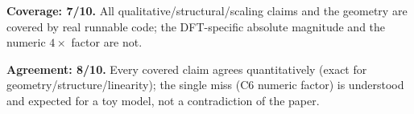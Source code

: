 \documentclass[11pt]{article}
\begin{document}
\medskip
\noindent\textbf{Coverage: 7/10.} All qualitative/structural/scaling claims and
the geometry are covered by real runnable code; the DFT-specific absolute
magnitude and the numeric $4\times$ factor are not.

\noindent\textbf{Agreement: 8/10.} Every covered claim agrees quantitatively
(exact for geometry/structure/linearity); the single miss (C6 numeric factor) is
understood and expected for a toy model, not a contradiction of the paper.
\end{document}
